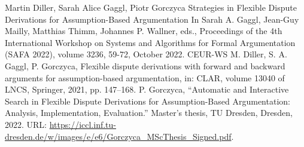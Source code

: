 \documentclass[conference]{IEEEtran}
\begin{document}
\begin{thebibliography}{00}
Martin Diller, Sarah Alice Gaggl, Piotr Gorczyca
Strategies in Flexible Dispute Derivations for Assumption-Based Argumentation In Sarah A. Gaggl, Jean-Guy Mailly, Matthias Thimm, Johannes P. Wallner, eds., Proceedings of the 4th International Workshop on Systems and Algorithms for Formal Argumentation (SAFA 2022), volume 3236, 59-72, October 2022. CEUR-WS
M. Diller, S. A. Gaggl, P. Gorczyca, Flexible dispute derivations with forward and backward
arguments for assumption-based argumentation, in: CLAR, volume 13040 of LNCS, Springer,
2021, pp. 147–168.
 P. Gorczyca, ``Automatic and Interactive Search in Flexible Dispute Derivations for Assumption-Based Argumentation: Analysis, Implementation, Evaluation.'' Master's thesis, TU Dresden, Dresden, 2022. URL: \url{https://iccl.inf.tu-dresden.de/w/images/e/e6/Gorczyca_MScThesis_Signed.pdf}.
\end{thebibliography}
\end{document}

